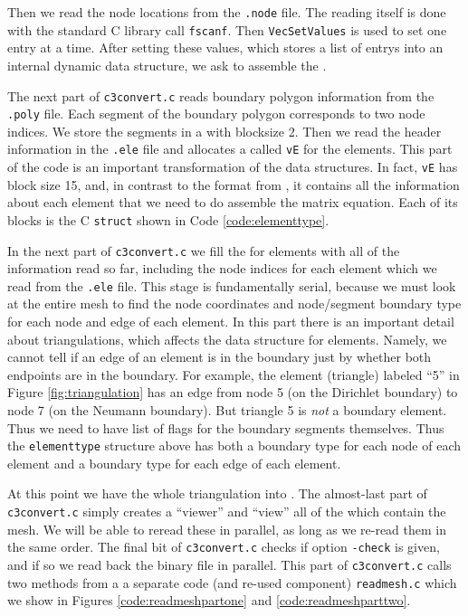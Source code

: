 Then we read the node locations from the \texttt{.node} file.  The reading itself is done with the standard C library call \texttt{fscanf}.  Then \texttt{VecSetValues} is used to set one entry at a time.  After setting these values, which stores a list of entrys into an internal \PETSc dynamic data structure, we ask \PETSc to assemble the \pVecs.

The next part of \texttt{c3convert.c} reads boundary polygon information from the \texttt{.poly} file.  Each segment of the boundary polygon corresponds to two node indices.  We store the segments in a \pVec with blocksize 2.  Then we read the header information in the \texttt{.ele} file and allocates a \pVec called \texttt{vE} for the elements.  This part of the code is an important transformation of the data structures.  In fact, \texttt{vE} has block size 15, and, in contrast to the format from \Triangle, it contains all the information about each element that we need to do assemble the matrix equation.  Each of its blocks is the C \texttt{struct} shown in Code \ref{code:elementtype}.


In the next part of \texttt{c3convert.c} we fill the \pVec for elements with all of the information read so far, including the node indices for each element which we read from the \texttt{.ele} file.  This stage is fundamentally serial, because we must look at the entire mesh to find the node coordinates and node/segment boundary type for each node and edge of each element.  In this part there is an important detail about triangulations, which affects the data structure for elements.  Namely, we cannot tell if an edge of an element is in the boundary just by whether both endpoints are in the boundary.  For example, the element (triangle) labeled ``5'' in Figure \ref{fig:triangulation} has an edge from node 5 (on the Dirichlet boundary) to node 7 (on the Neumann boundary).  But triangle 5 is \emph{not} a boundary element.  Thus we need to have list of flags for the boundary segments themselves.  Thus the \texttt{elementtype} structure above has both a boundary type for each node of each element and a boundary type for each edge of each element.

At this point we have the whole triangulation into \PETSc \pVecs.  The almost-last part of \texttt{c3convert.c} simply creates a \PETSc ``viewer'' and ``view'' all of the \pVecs which contain the mesh.  We will be able to reread these \pVecs in parallel, as long as we re-read them in the same order.  The final bit of \texttt{c3convert.c} checks if option \texttt{-check} is given, and if so we read back the binary file in parallel.  This part of \texttt{c3convert.c} calls two methods from a a separate code (and re-used component) \texttt{readmesh.c} which we show in Figures \ref{code:readmeshpartone} and \ref{code:readmeshparttwo}.

